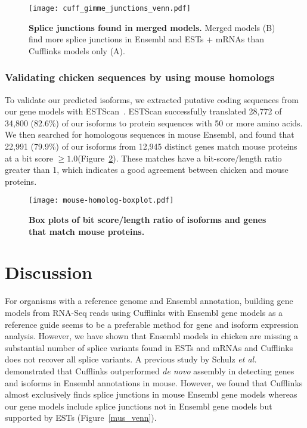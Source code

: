 \clearpage\pagestyle{lscape}
\begin{landscape}
\begin{figure}[!ht]
\begin{center}
\texttt{[image: cuff\_gimme\_junctions\_venn.pdf]}
\end{center}
\caption{
    \textbf{Splice junctions found in merged models.} Merged models (B) find more
    splice junctions in Ensembl and ESTs + mRNAs than Cufflinks models only (A).
}
\label{combined_venn}
\end{figure}
\end{landscape}
\pagestyle{plain}

\subsubsection{Validating chicken sequences by using mouse homologs}

To validate our predicted isoforms, we extracted putative coding
sequences from our gene models with ESTScan~\cite{Iseli:1999vd}.
ESTScan successfully translated 28,772 of 34,800 (82.6\%) of our
isoforms to protein sequences with 50 or more amino acids.  We
then searched for homologous sequences in mouse Ensembl, and
found that 22,991 (79.9\%) of our isoforms from 12,945 distinct
genes match mouse proteins at a bit score
$\ge1.0$(Figure~\ref{bitscore}).  These matches have a
bit-score/length ratio greater than 1, which indicates a good
agreement between chicken and mouse proteins.

\begin{figure}[!ht]
\begin{center}
\texttt{[image: mouse-homolog-boxplot.pdf]}
\end{center}
\caption{
\textbf{Box plots of bit score/length ratio of isoforms and genes that match mouse
proteins.}
}
\label{bitscore}
\end{figure}


\section{Discussion}

For organisms with a reference genome and Ensembl annotation, building gene
models from RNA-Seq reads using Cufflinks with Ensembl gene models as a
reference guide seems to be a preferable method for gene and isoform expression
analysis.  However, we have shown that Ensembl models in chicken are missing a
substantial number of splice variants found in ESTs and mRNAs and Cufflinks does
not recover all splice variants.  A previous study by Schulz \emph{et
al.}~\cite{Schulz:2012je} demonstrated that Cufflinks outperformed \emph{de novo}
assembly in detecting genes and isoforms in Ensembl annotations in mouse.
However, we found that Cufflinks almost exclusively finds splice junctions in
mouse Ensembl gene models whereas our gene models include splice junctions not in
Ensembl gene models but supported by ESTs (Figure~\ref{mus_venn}). 


